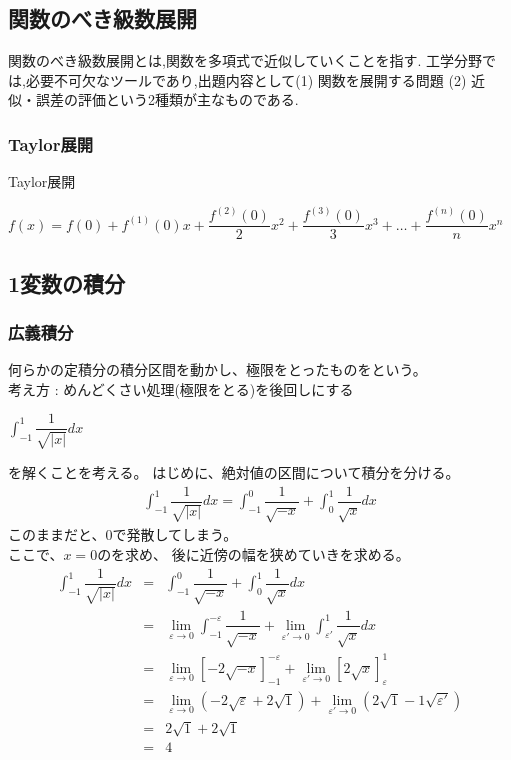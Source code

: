 \documentclass[a4paper]{jsarticle}
\begin{document}
\subsection{関数のべき級数展開}
関数のべき級数展開とは,関数を多項式で近似していくことを指す.
工学分野では,必要不可欠なツールであり,出題内容として(1) 関数を展開する問題
(2) 近似・誤差の評価という2種類が主なものである.
\subsubsection{Taylor展開}
\begin{itembox}[l]{Taylor展開}
    \begin{center}
        $f\left(x\right)=f\left(0\right)+f^{\left(1\right)}\left(0\right)x
            +\dfrac{f^{\left(2\right)}\left(0\right)}{2}x^2
            +\dfrac{f^{\left(3\right)}\left(0\right)}{3}x^3
            +\dots
            +\dfrac{f^{\left(n\right)}\left(0\right)}{n}x^n$
    \end{center}
\end{itembox}
\subsection{1変数の積分}
\subsubsection{広義積分}
何らかの定積分の積分区間を動かし、極限をとったものをという。\\
考え方 : めんどくさい処理(極限をとる)を後回しにする
\begin{center}
    $\displaystyle\int ^1_{-1} \dfrac{1}{\sqrt{|x|}}dx$
\end{center}
を解くことを考える。
はじめに、絶対値の区間について積分を分ける。
\begin{eqnarray*}
    \displaystyle\int ^1_{-1} \dfrac{1}{\sqrt{|x|}}dx=\int ^0_{-1} \dfrac{1}{\sqrt{-x}}+\int ^1_{0} \dfrac{1}{\sqrt{x}}dx
\end{eqnarray*}
このままだと、$0$で発散してしまう。\\
ここで、$x=0$のを求め、
後に近傍の幅を狭めていきを求める。
\begin{eqnarray*}
    \displaystyle
    \int ^1_{-1} \dfrac{1}{\sqrt{|x|}}dx&=&\int ^0_{-1} \dfrac{1}{\sqrt{-x}}+\int ^1_{0} \dfrac{1}{\sqrt{x}}dx\\
    &=&\lim_{\varepsilon\rightarrow 0}\int ^{-\varepsilon}_{-1} \dfrac{1}{\sqrt{-x}}+\lim_{\varepsilon'\rightarrow 0}\int ^1_{\varepsilon'} \dfrac{1}{\sqrt{x}}dx\\
    &=&\lim_{\varepsilon\rightarrow 0}\left[-2\sqrt{-x}\right]^{-\varepsilon}_{-1}+\lim_{\varepsilon'\rightarrow0}\left[2\sqrt{x}\right]^{1}_{\varepsilon}\\
    &=&\lim_{\varepsilon\rightarrow 0}\left(-2\sqrt{\varepsilon}+2\sqrt{1}\right)+\lim_{\varepsilon'\rightarrow0}\left(2\sqrt{1}-1\sqrt{\varepsilon'}\right)\\
    &=&2\sqrt{1}+2\sqrt{1}\\
    &=&4
\end{eqnarray*}
\end{document}
